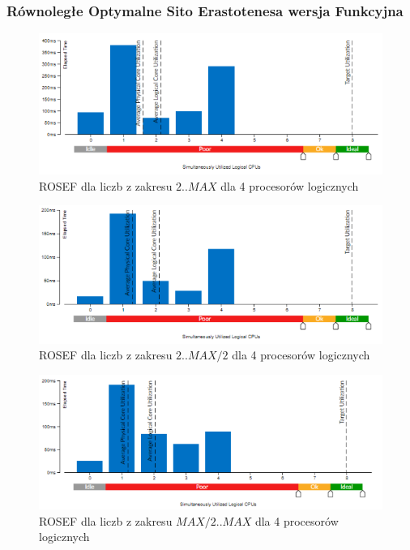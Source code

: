 \documentclass{article}
\begin{document}
            \subsubsection{Równoległe Optymalne Sito Erastotenesa wersja Funkcyjna}
                \begin{figure}[H]
                    \includegraphics[width=13cm]{rownolegly_funcion_opt4_2_MAX}
                    \caption{\gls{ROSEF} dla liczb z zakresu $2 .. MAX$ dla 4 procesorów logicznych}
                \end{figure}
                \begin{figure}[H]
                    \includegraphics[width=13cm]{rownolegly_funcion_opt4_2_MAX2}
                    \caption{\gls{ROSEF} dla liczb z zakresu $2 .. MAX / 2$ dla 4 procesorów logicznych}
                \end{figure}
                \begin{figure}[H]
                    \includegraphics[width=13cm]{rownolegly_funcion_opt4_MAX2_MAX}
                    \caption{\gls{ROSEF} dla liczb z zakresu $MAX / 2 .. MAX$ dla 4 procesorów logicznych}
                \end{figure}
\end{document}
